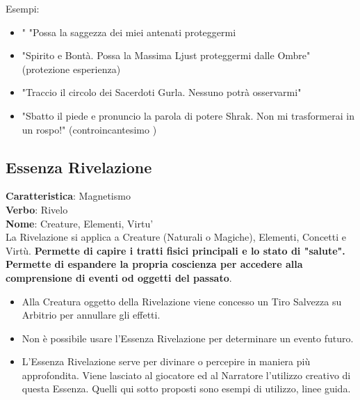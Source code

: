 \documentclass[a4paper,11pt,twoside,openany]{book}
\begin{document}
\bigskip


Esempi:
\begin{itemize}
	\item "
	      "Possa la saggezza dei miei antenati proteggermi
	\item
	      "Spirito e Bontà. Possa la Massima Ljust proteggermi dalle Ombre" (protezione esperienza)
	\item
	      "Traccio il circolo dei Sacerdoti Gurla. Nessuno potrà osservarmi"
	\item
	      "Sbatto il piede e pronuncio la parola di potere Shrak. Non mi trasformerai in un rospo!" (controincantesimo )
\end{itemize}

\pagebreak

\subsection{Essenza Rivelazione}

\label{essenza-rivelazione---magnetismo}

\textbf{Caratteristica}: Magnetismo\\
\textbf{Verbo}: Rivelo\\
\textbf{Nome}: Creature, Elementi, Virtu'\\

La Rivelazione si applica a Creature (Naturali o Magiche), Elementi, Concetti e Virtù. \textbf{Permette di capire i tratti fisici principali e lo stato di "salute". Permette di espandere la propria coscienza per accedere alla comprensione di eventi od oggetti del passato}.
\begin{itemize}
	\item
	      Alla Creatura oggetto della Rivelazione viene concesso un Tiro Salvezza
	      su Arbitrio per annullare gli effetti.
	\item
	      Non è possibile usare l'Essenza Rivelazione per determinare un evento futuro.
	\item
	      L'Essenza Rivelazione serve per divinare o percepire in maniera più approfondita. Viene lasciato al giocatore ed al Narratore l'utilizzo creativo di questa Essenza. Quelli qui sotto proposti sono esempi di utilizzo, linee guida.
\end{itemize}

\bigskip
\end{document}
